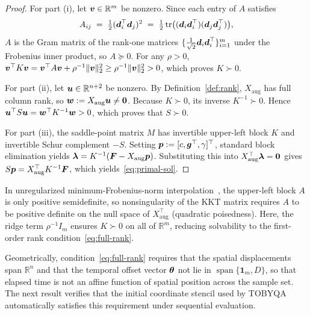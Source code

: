 \begin{proof}
For part (i), let $\boldsymbol{v} \in \mathbb{R}^{m}$ be nonzero. Since each entry of $A$ satisfies
\[
  A_{ij} \;=\; \tfrac{1}{2}(\boldsymbol{d}_i^\top \boldsymbol{d}_j)^2 \;=\; \tfrac{1}{2}\operatorname{tr}\bigl((\boldsymbol{d}_i \boldsymbol{d}_i^\top)(\boldsymbol{d}_j \boldsymbol{d}_j^\top)\bigr),
\]
$A$ is the Gram matrix of the rank-one matrices $\{\tfrac{1}{\sqrt{2}} \boldsymbol{d}_i \boldsymbol{d}_i^\top\}_{i=1}^m$ under the Frobenius inner product, so $A \succeq 0$. For any $\rho > 0$, $\boldsymbol{v}^\top K \boldsymbol{v} = \boldsymbol{v}^\top A \boldsymbol{v} + \rho^{-1}\|\boldsymbol{v}\|_2^2 \ge \rho^{-1}\|\boldsymbol{v}\|_2^2 > 0$, which proves $K \succ 0$.

For part (ii), let $\boldsymbol{u} \in \mathbb{R}^{n+2}$ be nonzero. By Definition~\ref{def:rank}, $X_{\mathrm{aug}}$ has full column rank, so $\boldsymbol{w} := X_{\mathrm{aug}} \boldsymbol{u} \ne \boldsymbol{0}$. Because $K \succ 0$, its inverse $K^{-1} \succ 0$. Hence $\boldsymbol{u}^\top S \boldsymbol{u} = \boldsymbol{w}^\top K^{-1} \boldsymbol{w} > 0$, which proves that $S \succ 0$.

For part (iii), the saddle-point matrix $M$ has invertible upper-left block $K$ and invertible Schur complement $-S$. Setting $\boldsymbol{p} := [c, \boldsymbol{g}^\top, \gamma]^\top$, standard block elimination yields $\boldsymbol{\lambda} = K^{-1}(\boldsymbol{F} - X_{\mathrm{aug}}\boldsymbol{p})$. Substituting this into $X_{\mathrm{aug}}^\top \boldsymbol{\lambda} = \boldsymbol{0}$ gives $S \boldsymbol{p} = X_{\mathrm{aug}}^\top K^{-1} \boldsymbol{F}$, which yields~\eqref{eq:primal-sol}.
\end{proof}

\begin{remark}
\label{rem:poisedness}
In unregularized minimum-Frobenius-norm interpolation~\cite{ConnScheinbergVicente2009,Powell2006NEWUOA}, the upper-left block $A$ is only positive semidefinite, so nonsingularity of the KKT matrix requires $A$ to be positive definite on the null space of $X_{\mathrm{aug}}^\top$ (quadratic poisedness). Here, the ridge term $\rho^{-1} I_m$ ensures $K \succ 0$ on all of $\mathbb{R}^m$, reducing solvability to the first-order rank condition~\eqref{eq:full-rank}.
\end{remark}

Geometrically, condition~\eqref{eq:full-rank} requires that the spatial displacements span $\mathbb{R}^n$ and that the temporal offset vector $\boldsymbol{\theta}$ not lie in $\operatorname{span}\{\mathbf{1}_m, D\}$, so that elapsed time is not an affine function of spatial position across the sample set. The next result verifies that the initial coordinate stencil used by TOBYQA automatically satisfies this requirement under sequential evaluation.

